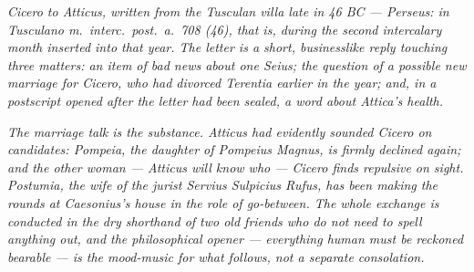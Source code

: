 
\textit{Cicero to Atticus, written from the Tusculan villa late in 46
BC --- Perseus: \textit{in Tusculano m.~interc.~post.~a.~708 (46)},
that is, during the second intercalary month inserted into that
year. The letter is a short, businesslike reply touching three
matters: an item of bad news about one Seius; the question of a
possible new marriage for Cicero, who had divorced Terentia
earlier in the year; and, in a postscript opened after the letter
had been sealed, a word about Attica's health.}

\textit{The marriage talk is the substance. Atticus had evidently
sounded Cicero on candidates: Pompeia, the daughter of Pompeius
Magnus, is firmly declined again; and the other woman --- Atticus
will know who --- Cicero finds repulsive on sight. Postumia, the
wife of the jurist Servius Sulpicius Rufus, has been making the
rounds at Caesonius's house in the role of go-between. The whole
exchange is conducted in the dry shorthand of two old friends who
do not need to spell anything out, and the philosophical
opener --- everything human must be reckoned bearable --- is the
mood-music for what follows, not a separate consolation.}
